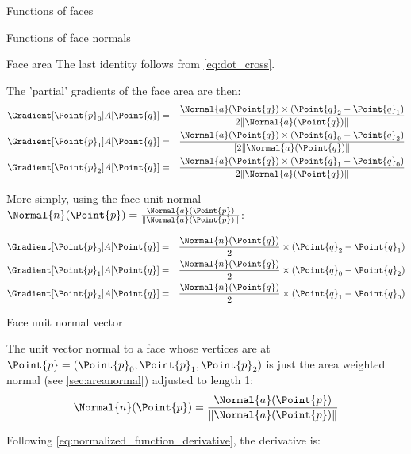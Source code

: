 \begin{plSection}{Functions of faces}
\begin{plSection}{Functions of face normals}
\begin{plSection}{Face area}
The last identity follows from \cref{eq:dot_cross}.

The 'partial' gradients of the face area are then:
\begin{eqnarray}
\Gradient[\Point{p}_0]{A}[\Point{q}] 
& = & 
\frac{
\Normal{a}
(\Point{q}) \times (\Point{q}_2 - \Point{q}_1)}
{2\|\Normal{a}(\Point{q})\|} \\
\Gradient[\Point{p}_1]{A}[\Point{q}] 
& = & \frac{
\Normal{a}
(\Point{q}) \times (\Point{q}_0 - \Point{q}_2)}
{[2\|\Normal{a}(\Point{q})\|} \nonumber \\
\Gradient[\Point{p}_2]{A}[\Point{q}]
& = & \frac{
\Normal{a}
(\Point{q}) \times (\Point{q}_1 - \Point{q}_0)}
{2\|\Normal{a}(\Point{q})\|} \nonumber
\end{eqnarray}

More simply, using the face unit normal 
\( \Normal{n}(\Point{p})  
=  
\frac{\Normal{a}(\Point{p})}{\| \Normal{a}(\Point{p}) \|} \):

\begin{eqnarray}
\label{eq:area_gradient}
\Gradient[\Point{p}_0]{A}[\Point{q}] 
& = & 
\frac{\Normal{n}(\Point{q})}{2} 
\times (\Point{q}_2 - \Point{q}_1) \\
\Gradient[\Point{p}_1]{A}[\Point{q}] 
& = & 
\frac{\Normal{n}(\Point{q})}{2} 
\times (\Point{q}_0 - \Point{q}_2) \nonumber \\
\Gradient[\Point{p}_2]{A}[\Point{q}] 
& = & 
\frac{\Normal{n}(\Point{q})}{2} 
\times (\Point{q}_1 - \Point{q}_0) \nonumber
\end{eqnarray}

\end{plSection}%
\begin{plSection}{Face unit normal vector}
\label{sec:facenormal}

The unit vector normal to a face whose vertices are at
$\Point{p} = (\Point{p}_0,\Point{p}_1,\Point{p}_2)$ is just the area weighted normal (see \cref{sec:areanormal})
adjusted to length 1:
\begin{equation}
\Normal{n}(\Point{p})  =  \frac{\Normal{a}(\Point{p})}{\| \Normal{a}(\Point{p}) \|}
\end{equation}

Following \cref{eq:normalized_function_derivative}, the derivative is:


\end{plSection}
\end{plSection}
\end{plSection}
